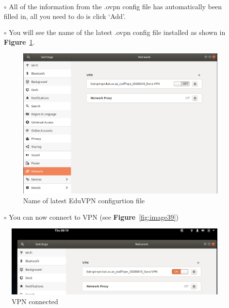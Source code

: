 \begin{itemize}
\begin{itemize}
\item[$\circ$] All of the information from the .ovpn config file has  automatically been filled in, all you need to do is click ‘Add’.

\item[$\circ$] You will see the name of the latest .ovpn config file installed as shown in \textbf{Figure}~\ref{fig:image60}.
\begin{figure}[H]
	\centering
	\includegraphics[scale=0.22]{Chapters/images/image60.png}
	
	\caption{Name of latest EduVPN configurtion file }
	\label{fig:image60}
\end{figure}


\item[$\circ$] You can now connect to VPN (see \textbf{Figure}~\ref{fig:image39})
\end{itemize}
\begin{figure}[!thb]
	\centering
	\includegraphics[scale=0.21]{Chapters/images/image101.png}
	
	\caption{VPN connected}
	\label{fig:image101}
\end{figure}


\end{itemize}
